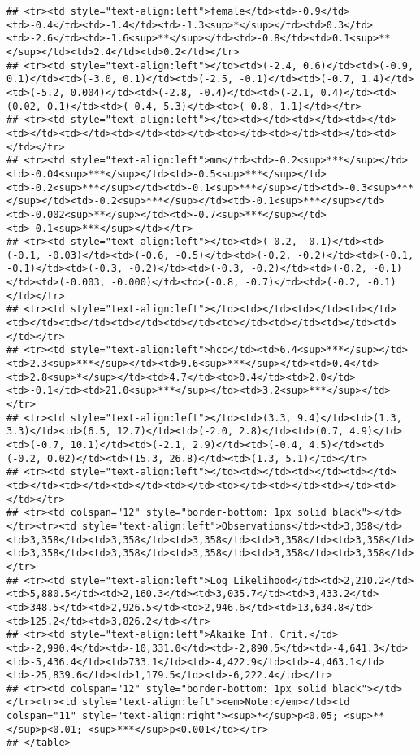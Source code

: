 \documentclass[]{article}
\begin{document}
\begin{verbatim}
## <tr><td style="text-align:left">female</td><td>-0.9</td><td>-0.4</td><td>-1.4</td><td>-1.3<sup>*</sup></td><td>0.3</td><td>-2.6</td><td>-1.6<sup>**</sup></td><td>-0.8</td><td>0.1<sup>**</sup></td><td>2.4</td><td>0.2</td></tr>
## <tr><td style="text-align:left"></td><td>(-2.4, 0.6)</td><td>(-0.9, 0.1)</td><td>(-3.0, 0.1)</td><td>(-2.5, -0.1)</td><td>(-0.7, 1.4)</td><td>(-5.2, 0.004)</td><td>(-2.8, -0.4)</td><td>(-2.1, 0.4)</td><td>(0.02, 0.1)</td><td>(-0.4, 5.3)</td><td>(-0.8, 1.1)</td></tr>
## <tr><td style="text-align:left"></td><td></td><td></td><td></td><td></td><td></td><td></td><td></td><td></td><td></td><td></td><td></td></tr>
## <tr><td style="text-align:left">mm</td><td>-0.2<sup>***</sup></td><td>-0.04<sup>***</sup></td><td>-0.5<sup>***</sup></td><td>-0.2<sup>***</sup></td><td>-0.1<sup>***</sup></td><td>-0.3<sup>***</sup></td><td>-0.2<sup>***</sup></td><td>-0.1<sup>***</sup></td><td>-0.002<sup>**</sup></td><td>-0.7<sup>***</sup></td><td>-0.1<sup>***</sup></td></tr>
## <tr><td style="text-align:left"></td><td>(-0.2, -0.1)</td><td>(-0.1, -0.03)</td><td>(-0.6, -0.5)</td><td>(-0.2, -0.2)</td><td>(-0.1, -0.1)</td><td>(-0.3, -0.2)</td><td>(-0.3, -0.2)</td><td>(-0.2, -0.1)</td><td>(-0.003, -0.000)</td><td>(-0.8, -0.7)</td><td>(-0.2, -0.1)</td></tr>
## <tr><td style="text-align:left"></td><td></td><td></td><td></td><td></td><td></td><td></td><td></td><td></td><td></td><td></td><td></td></tr>
## <tr><td style="text-align:left">hcc</td><td>6.4<sup>***</sup></td><td>2.3<sup>***</sup></td><td>9.6<sup>***</sup></td><td>0.4</td><td>2.8<sup>*</sup></td><td>4.7</td><td>0.4</td><td>2.0</td><td>-0.1</td><td>21.0<sup>***</sup></td><td>3.2<sup>***</sup></td></tr>
## <tr><td style="text-align:left"></td><td>(3.3, 9.4)</td><td>(1.3, 3.3)</td><td>(6.5, 12.7)</td><td>(-2.0, 2.8)</td><td>(0.7, 4.9)</td><td>(-0.7, 10.1)</td><td>(-2.1, 2.9)</td><td>(-0.4, 4.5)</td><td>(-0.2, 0.02)</td><td>(15.3, 26.8)</td><td>(1.3, 5.1)</td></tr>
## <tr><td style="text-align:left"></td><td></td><td></td><td></td><td></td><td></td><td></td><td></td><td></td><td></td><td></td><td></td></tr>
## <tr><td colspan="12" style="border-bottom: 1px solid black"></td></tr><tr><td style="text-align:left">Observations</td><td>3,358</td><td>3,358</td><td>3,358</td><td>3,358</td><td>3,358</td><td>3,358</td><td>3,358</td><td>3,358</td><td>3,358</td><td>3,358</td><td>3,358</td></tr>
## <tr><td style="text-align:left">Log Likelihood</td><td>2,210.2</td><td>5,880.5</td><td>2,160.3</td><td>3,035.7</td><td>3,433.2</td><td>348.5</td><td>2,926.5</td><td>2,946.6</td><td>13,634.8</td><td>125.2</td><td>3,826.2</td></tr>
## <tr><td style="text-align:left">Akaike Inf. Crit.</td><td>-2,990.4</td><td>-10,331.0</td><td>-2,890.5</td><td>-4,641.3</td><td>-5,436.4</td><td>733.1</td><td>-4,422.9</td><td>-4,463.1</td><td>-25,839.6</td><td>1,179.5</td><td>-6,222.4</td></tr>
## <tr><td colspan="12" style="border-bottom: 1px solid black"></td></tr><tr><td style="text-align:left"><em>Note:</em></td><td colspan="11" style="text-align:right"><sup>*</sup>p<0.05; <sup>**</sup>p<0.01; <sup>***</sup>p<0.001</td></tr>
## </table>
\end{verbatim}
\end{document}
